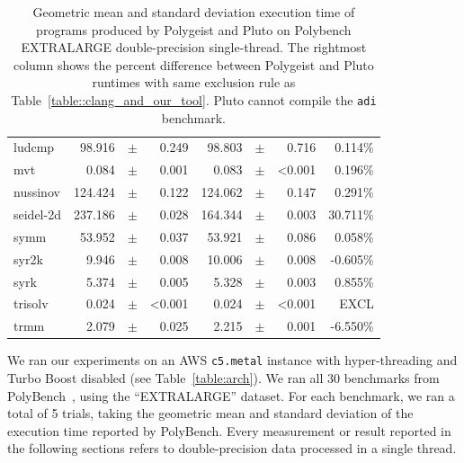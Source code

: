 \documentclass[sigplan]{acmart}
\newcommand{\icode}[1]{{\texttt {#1}}}
\newcommand{\tool}{Polygeist\xspace}
\begin{document}
\begin{table}
{\begin{center}
\begin{tabular}{p{1.2cm}rp{0.08cm}rrp{0.08cm}rr}
ludcmp        & 98.916 & $\pm$ & 0.249 & 98.803 & $\pm$ & 0.716 & 0.114\%   \\
\rowcolor{aluminium1}
mvt           & 0.084  & $\pm$ & 0.001 & 0.083  & $\pm$ &<0.001 & 0.196\%   \\
nussinov      & 124.424& $\pm$ & 0.122 & 124.062& $\pm$ & 0.147 & 0.291\%   \\
\rowcolor{aluminium1}
seidel-2d     & 237.186& $\pm$ & 0.028 & 164.344& $\pm$ & 0.003 & 30.711\%  \\
symm          & 53.952 & $\pm$ & 0.037 & 53.921 & $\pm$ & 0.086 & 0.058\%   \\
\rowcolor{aluminium1}
syr2k         & 9.946  & $\pm$ & 0.008 & 10.006 & $\pm$ & 0.008 & -0.605\%  \\
syrk          & 5.374  & $\pm$ & 0.005 & 5.328  & $\pm$ & 0.003 & 0.855\%   \\
\rowcolor{aluminium1}
trisolv       & 0.024  & $\pm$ &<0.001 & 0.024  & $\pm$ &<0.001 & EXCL      \\
trmm          & 2.079  & $\pm$ & 0.025 & 2.215  & $\pm$ & 0.001 & -6.550\%  \\
\bottomrule
\end{tabular}
\end{center}
}
\caption{Geometric mean and standard deviation execution time of programs produced by \tool and Pluto on Polybench EXTRALARGE double-precision single-thread. The rightmost column shows the percent difference between \tool and Pluto runtimes with same exclusion rule as Table~\ref{table::clang_and_our_tool}. Pluto cannot compile the \icode{adi} benchmark.}
\label{table::polymer}
\end{table}


We ran our experiments on an AWS \icode{c5.metal} instance with hyper-threading and Turbo Boost disabled (see Table~\ref{table:arch}).
We ran all 30 benchmarks from PolyBench~\cite{polybench}, using the ``EXTRALARGE'' dataset. For each benchmark, we ran a total of 5 trials, taking the geometric mean and standard deviation of the execution time reported by PolyBench. Every measurement or result reported in the following sections refers to double-precision data processed in a single thread.
\end{document}
